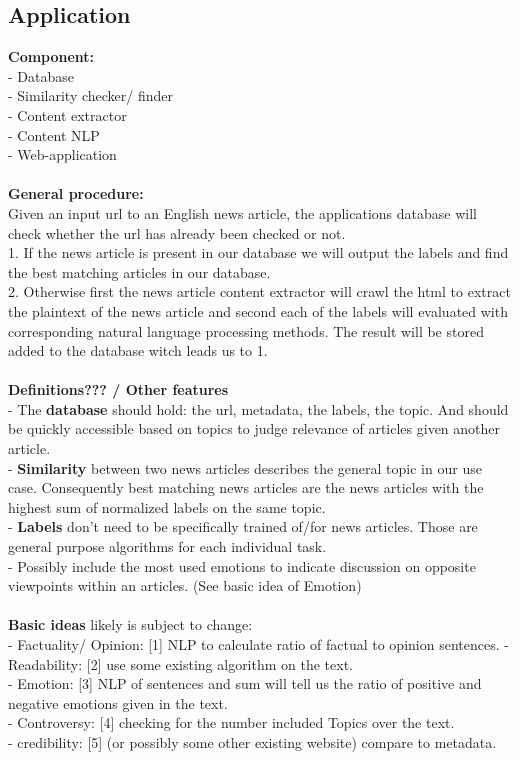\documentclass[11pt]{article}
\begin{document}
\begin{multicols}{2}
\section{Application}
\textbf{Component:}\\
- Database \\
- Similarity checker/ finder\\
- Content extractor\\
- Content NLP\\
- Web-application\\
\\
\textbf{General procedure:}\\
Given an input url to an English news article, the applications database will check whether the url has already been checked or not.\\
1. If the news article is present in our database we will output the labels and find the best matching articles in our database. \\
2. Otherwise first the news article content extractor will crawl the html to extract the plaintext of the news article and second each of the labels will evaluated with corresponding natural language processing methods. The result will be stored added to the database witch leads us to 1.\\
\\
\textbf{Definitions??? / Other features}\\
- The \textbf{database} should hold: the url, metadata, the labels, the topic. And should be quickly accessible based on topics to judge relevance of articles given another article.\\
- \textbf{Similarity} between two news articles describes the general topic in our use case. Consequently best matching news articles are the news articles with the highest sum of normalized labels on the same topic.\\
- \textbf{Labels} don't need to be specifically trained of/for news articles. Those are general purpose algorithms for each individual task.\\
- Possibly include the most used emotions to indicate discussion on opposite viewpoints within an articles. (See basic idea of Emotion) \\
\\
\textbf{Basic ideas} likely is subject to change:\\
- Factuality/ Opinion: [1] NLP to calculate ratio of factual to opinion sentences.
- Readability: [2] use some existing algorithm on the text.  \\
- Emotion: [3] NLP of sentences and sum will tell us the ratio of positive and negative emotions given in the text. \\
- Controversy: [4] checking for the number included Topics over the text. \\
- credibility: [5] (or possibly some other existing website) compare to metadata. \\

\end{multicols}
\end{document}
